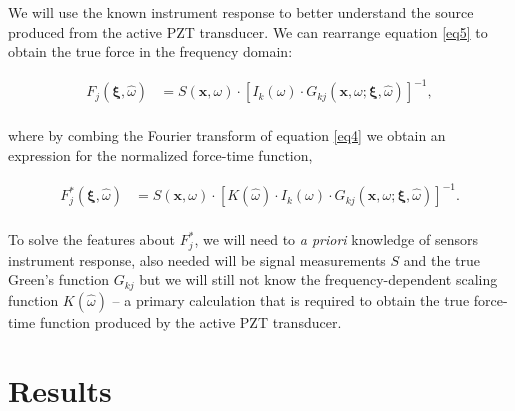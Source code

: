 \documentclass[preprint,3p, 11pt,authoryear]{elsarticle}
\begin{document}
We will use the known instrument response to better understand the source produced from the active PZT transducer.  We can rearrange equation \eqref{eq5} to obtain the true force in the frequency domain:

\begin{equation}
    \label{eq6}
\begin{split}
F_{j}\left( \mathbf{\xi}, \hat{\omega} \right) & = 
        S\left( \mathbf{x}, \omega \right) \cdot \left[ I_{k}\left(\omega \right) \cdot G_{kj}\left( \mathbf{x}, \omega; \mathbf{\xi}, \hat{\omega} \right)\right]^{-1}, \\
\end{split}
\end{equation}

\noindent where by combing the Fourier transform of equation \eqref{eq4} we obtain an expression for the normalized force-time function,

\begin{equation}
    \label{eq7}
\begin{split}
F^{*}_{j}\left( \mathbf{\xi}, \hat{\omega} \right) & = 
        S\left( \mathbf{x}, \omega \right) \cdot \left[ K\left(\hat{\omega}\right) \cdot I_{k}\left(\omega \right) \cdot G_{kj}\left( \mathbf{x}, \omega; \mathbf{\xi}, \hat{\omega} \right)\right]^{-1}.\\     
\end{split}
\end{equation}

\noindent To solve the features about $F^{*}_{j}$, we will need to \textit{a priori} knowledge of sensors instrument response, also needed will be signal measurements $S$ and the true Green's function $G_{kj}$ but we will still not know the frequency-dependent scaling function $K(\hat{\omega})$ -- a primary calculation that is required to obtain the true force-time function produced by the active PZT transducer.

\section{Results}
\label{results}
\end{document}

